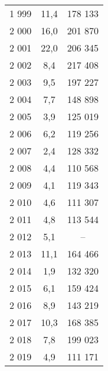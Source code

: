 \documentclass[french,11pt]{book}
\begin{document}
\begin{longtable}[t]{ccc}
1 999 & 11,4 & 178 133\\
2 000 & 16,0 & 201 870\\
2 001 & 22,0 & 206 345\\
2 002 & 8,4 & 217 408\\
2 003 & 9,5 & 197 227\\
2 004 & 7,7 & 148 898\\
2 005 & 3,9 & 125 019\\
2 006 & 6,2 & 119 256\\
2 007 & 2,4 & 128 332\\
2 008 & 4,4 & 110 568\\
2 009 & 4,1 & 119 343\\
2 010 & 4,6 & 111 307\\
2 011 & 4,8 & 113 544\\
2 012 & 5,1 & --\\
2 013 & 11,1 & 164 466\\
2 014 & 1,9 & 132 320\\
2 015 & 6,1 & 159 424\\
2 016 & 8,9 & 143 219\\
2 017 & 10,3 & 168 385\\
2 018 & 7,8 & 199 023\\
2 019 & 4,9 & 111 171\\*
\end{longtable}
\clearpage
\end{document}
